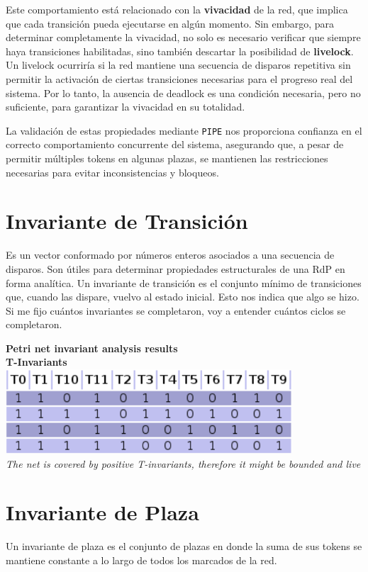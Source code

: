 \documentclass[12pt]{article}
\begin{document}
Este comportamiento está relacionado con la \textbf{vivacidad} de la red, que implica que cada transición pueda ejecutarse en algún momento. Sin embargo, para determinar completamente la vivacidad, no solo es necesario verificar que siempre haya transiciones habilitadas, sino también descartar la posibilidad de \textbf{livelock}. Un livelock ocurriría si la red mantiene una secuencia de disparos repetitiva sin permitir la activación de ciertas transiciones necesarias para el progreso real del sistema. Por lo tanto, la ausencia de deadlock es una condición necesaria, pero no suficiente, para garantizar la vivacidad en su totalidad.

\bigskip

La validación de estas propiedades mediante \texttt{PIPE} nos proporciona confianza en el correcto comportamiento concurrente del sistema, asegurando que, a pesar de permitir múltiples tokens en algunas plazas, se mantienen las restricciones necesarias para evitar inconsistencias y bloqueos.
\newpage

\section{Invariante de Transición}
Es un vector conformado por números enteros asociados a una secuencia de disparos. Son útiles para determinar propiedades estructurales de una RdP en forma analítica. Un invariante de transición es el conjunto mínimo de transiciones que, cuando las dispare, vuelvo al estado inicial. Esto nos indica que algo se hizo. Si me fijo cuántos invariantes se completaron, voy a entender cuántos ciclos se completaron.

\begin{center}
    \textbf{Petri net invariant analysis results}\\
    \textbf{T-Invariants}\\
    \includegraphics[width=0.8\textwidth]{T-invariants.png}\\
    \textit{The net is covered by positive T-invariants, therefore it might be bounded and live}
\end{center}

\section{Invariante de Plaza}
Un invariante de plaza es el conjunto de plazas en donde la suma de sus tokens se mantiene constante a lo largo de todos los marcados de la red.
\end{document}

